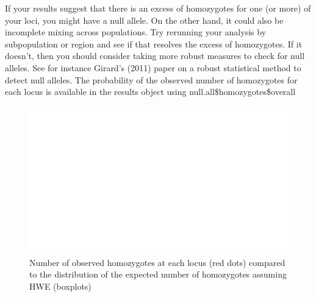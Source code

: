 \documentclass[a4paper]{scrartcl}\usepackage[]{graphicx}\usepackage[]{color}
\makeatletter
\def\maxwidth{ %
  \ifdim\Gin@nat@width>\linewidth
    \linewidth
  \else
    \Gin@nat@width
  \fi
}
\newenvironment{kframe}{%
 \def\at@end@of@kframe{}%
 \ifinner\ifhmode%
  \def\at@end@of@kframe{\end{minipage}}%
  \begin{minipage}{\columnwidth}%
 \fi\fi%
 \def\FrameCommand##1{\hskip\@totalleftmargin \hskip-\fboxsep
 \colorbox{shadecolor}{##1}\hskip-\fboxsep
     \hskip-\linewidth \hskip-\@totalleftmargin \hskip\columnwidth}%
 \MakeFramed {\advance\hsize-\width
   \@totalleftmargin\z@ \linewidth\hsize
   \@setminipage}}%
 {\par\unskip\endMakeFramed%
 \at@end@of@kframe}
\newenvironment{knitrout}{}{} %
\makeatother
\begin{document}
If your results suggest that there is an excess of homozygotes for one (or more) of your loci, you might have a null allele. On the other hand, it could also be incomplete mixing across populations. Try rerunning your analysis by subpopulation or region and see if that resolves the excess of homozygotes. If it doesn't, then you should consider taking more robust measures to check for null alleles. See for instance Girard's (2011) paper on a robust statistical method to detect null alleles.  
\newline
\newline The probability of the observed number of homozygotes for each locus is available in the results object using null.all\$homozygotes\$overall
\begin{knitrout}
\color{fgcolor}\begin{kframe}


{\ttfamily\noindent\bfseries\color{errorcolor}{\#\# Error in factor(X2): object 'X2' not found}}\end{kframe}\begin{figure}
\includegraphics[width=\maxwidth]{PopGenReport_Hatchery-null_all_overall_ho-1} \caption[Number of observed homozygotes at each locus (red dots) compared to the distribution of the expected number of homozygotes assuming HWE (boxplots)]{Number of observed homozygotes at each locus (red dots) compared to the distribution of the expected number of homozygotes assuming HWE (boxplots)}\label{fig:null_all_overall_ho}
\end{figure}


\end{knitrout}
\FloatBarrier
\end{document}
